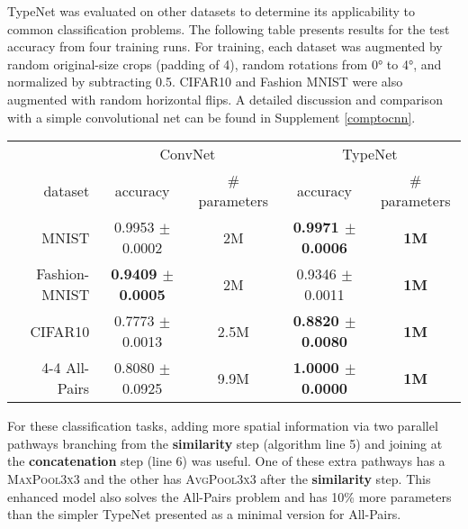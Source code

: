 TypeNet was evaluated on other datasets to determine its applicability
to common classification problems.  The following table presents results for the test
accuracy from four training runs.  For training, each dataset was augmented by random original-size
crops (padding of 4), random rotations from \ang{0} to \ang{4}, and normalized by subtracting 0.5.
CIFAR10 and Fashion MNIST \cite{fashionref}
were also augmented with random horizontal flips.  A detailed discussion and comparison with a simple convolutional net can be found in Supplement \ref{comptocnn}.

\begin{center}
\begin{tabular}{ r | c c | c c  }
              & \multicolumn{2}{c|}{ConvNet}                        & \multicolumn{2}{c}{TypeNet}  \\
dataset  & accuracy & \# parameters & accuracy & \# parameters \\
\hline
MNIST               & 0.9953 $\pm$ 0.0002    & 2M & \textbf{0.9971 $\pm$ 0.0006} & \textbf{1M}  \\
Fashion-MNIST & \textbf{0.9409 $\pm$ 0.0005}    & 2M & 0.9346 $\pm$ 0.0011 & \textbf{1M} \\
CIFAR10           & 0.7773 $\pm$ 0.0013     & 2.5M & \textbf{0.8820 $\pm$ 0.0080} & \textbf{1M} \\
4-4 All-Pairs      & 0.8080 $\pm$ 0.0925     & 9.9M & \textbf{1.0000 $\pm$ 0.0000} & \textbf{1M} \\
\end{tabular}
\end{center}


For these classification
tasks, adding more spatial information via two parallel pathways branching
from the \textbf{similarity} step (algorithm line 5) and joining at the \textbf{concatenation} step (line 6)
was useful.  One of these extra pathways has a \textsc{MaxPool3x3} and the other has \textsc{AvgPool3x3} after
the \textbf{similarity} step.  This enhanced model also solves the All-Pairs problem and has 10\% more parameters than the simpler TypeNet presented as a minimal version for All-Pairs.
